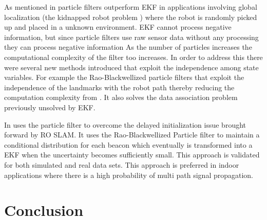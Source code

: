 \documentclass[conference]{IEEEtran}
\begin{document}
As mentioned in \cite{Thrun2002a} particle filters outperform EKF in applications involving global localization (the kidnapped robot problem ) where the robot is randomly picked up and placed in a unknown environment. 
EKF cannot process negative information, but since particle filters use raw sensor data without any processing they can process negative information\cite{Thrun2002a}
As the number of particles increases the computational complexity of the filter too increases. In order to address this there were several new methods introduced that  exploit the independence among state variables. For example the Rao-Blackwellized particle filters that exploit the independence of the landmarks with the robot path thereby reducing the computation complexity from \cite{Yuan2012}. It also solves the data association problem previously unsolved by EKF.
	

In \cite{Blanco2008a} uses the particle filter to overcome the delayed initialization issue brought forward by RO SLAM. It uses the Rao-Blackwellized Particle filter to maintain a conditional distribution for each beacon which eventually is transformed into a EKF when the uncertainty becomes sufficiently small. This approach is validated for both simulated and real data sets. This approach is preferred in indoor applications where there is a high probability of multi path signal propagation.

	
	
	
	
	
	
	
	
	
	
	
	
	
	
	
	
	\section{Conclusion}
	\label{conclusion}
	
	
	
	
	
	
	
	
	
	
	
\end{document}

